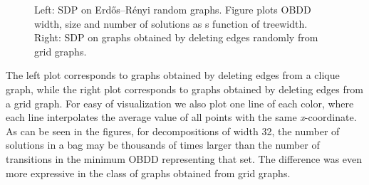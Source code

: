 \begin{figure}[h]
    \begin{subfigure}{0.48\textwidth}
        \centering
         \resizebox{\textwidth}{!}{}
        \label{fig:clique}
    \end{subfigure}
    \hfill
    \begin{subfigure}{0.48\textwidth}       
    \centering
    \resizebox{\textwidth}{!}{}
        \label{fig:grid}
    \end{subfigure}
    \caption{Left: SDP on Erd\H{o}s--R\'enyi random graphs. Figure plots OBDD width, size and number of solutions as s function of treewidth. Right: SDP on graphs obtained by deleting edges randomly from grid graphs. \label{fig:ComparisonSizes}}
   
\end{figure}
The left plot corresponds to graphs obtained by deleting edges from a clique graph, while the right plot corresponds to graphs obtained by deleting edges from a grid graph. 
For easy of visualization we also plot one line of each color, where each line interpolates the average value of all points with the same \textit{x}-coordinate. As can be seen in the figures, for decompositions of width 32, the number of solutions in a bag may be thousands of times larger than the number of transitions in the minimum OBDD representing that set. The difference was even more expressive in the class of graphs obtained from grid graphs. 

